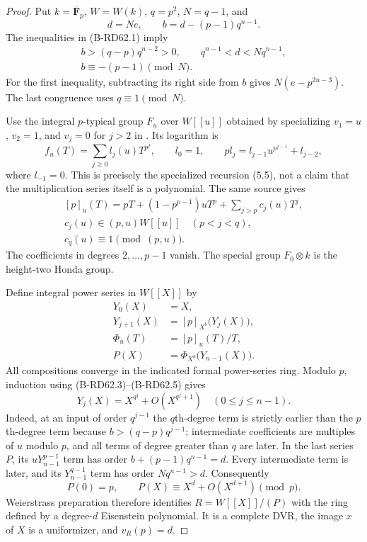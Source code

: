 \begin{proof}
Put $k=\overline{\mathbf F}_p$, $W=W(k)$, $q=p^2$, $N=q-1$, and
\[
             d=Ne,\qquad b=d-(p-1)q^{n-1}.              \tag{B-RD62.2}
\]
The inequalities in (B-RD62.1) imply
\[
 \begin{gathered}
 b>(q-p)q^{n-2}>0,\qquad q^{n-1}<d<Nq^{n-1},\\
 b\equiv-(p-1)\pmod N.
 \end{gathered}                                         \tag{B-RD62.3}
\]
For the first inequality, subtracting its right side from $b$ gives
$N(e-p^{2n-3})$.  The last congruence uses $q\equiv1\pmod N$.

Use the integral $p$-typical group $F_u$ over $W[[u]]$ obtained by
specializing $v_1=u$, $v_2=1$, and $v_j=0$ for $j>2$ in
\cite[Proposition~5.7, equations (5.3)--(5.5), and (12.3)--(12.5)]
{HopkinsGross1994Bundles}.
Its logarithm is
\[
 f_u(T)=\sum_{j\ge0}l_j(u)T^{p^j},\qquad l_0=1,
 \qquad p l_j=l_{j-1}u^{p^{j-1}}+l_{j-2},               \tag{B-RD62.4}
\]
where $l_{-1}=0$.  This is precisely the specialized recursion (5.5),
not a claim that the multiplication series itself is a polynomial.
The same source gives
\[
 \begin{gathered}
 [p]_u(T)=pT+(1-p^{p-1})uT^p+\sum_{j>p}c_j(u)T^j,\\
 c_j(u)\in(p,u)W[[u]]\quad(p<j<q),\\
 c_q(u)\equiv1\pmod{(p,u)}.
 \end{gathered}                                         \tag{B-RD62.5}
\]
The coefficients in degrees $2,\ldots,p-1$ vanish.  The special group
$F_0\otimes k$ is the height-two Honda group.

Define integral power series in $W[[X]]$ by
\[
 \begin{split}
 Y_0(X)&=X,\\
 Y_{j+1}(X)&=[p]_{X^b}\bigl(Y_j(X)\bigr),\\
 \Phi_u(T)&=[p]_u(T)/T,\\
 P(X)&=\Phi_{X^b}\bigl(Y_{n-1}(X)\bigr).
 \end{split}                                           \tag{B-RD62.6}
\]
All compositions converge in the indicated formal power-series ring.
Modulo $p$, induction using (B-RD62.3)--(B-RD62.5) gives
\[
                  Y_j(X)=X^{q^j}+O(X^{q^j+1})
                  \quad(0\le j\le n-1).                \tag{B-RD62.7}
\]
Indeed, at an input of order $q^{j-1}$ the $q$th-degree term is
strictly earlier than the $p$th-degree term because
$b>(q-p)q^{j-1}$; intermediate coefficients are multiples of $u$
modulo $p$, and all terms of degree greater than $q$ are later.
In the last series $P$, its $uY_{n-1}^{p-1}$ term has order
$b+(p-1)q^{n-1}=d$.  Every intermediate term is later, and its
$Y_{n-1}^{q-1}$ term has order $Nq^{n-1}>d$.  Consequently
\[
                    P(0)=p,\qquad
                    P(X)\equiv X^d+O(X^{d+1})\pmod p.  \tag{B-RD62.8}
\]
Weierstrass preparation therefore identifies
$R=W[[X]]/(P)$ with the ring defined by a degree-$d$ Eisenstein
polynomial.  It is a complete DVR, the image $x$ of $X$ is a
uniformizer, and $v_R(p)=d$.


\end{proof}
